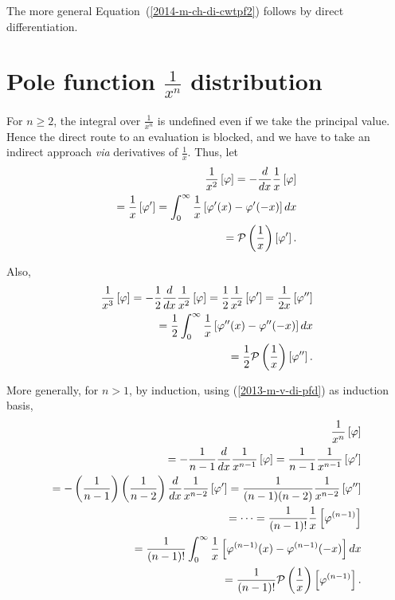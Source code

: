 {The more general Equation~(\ref{2014-m-ch-di-cwtpf2}) follows by direct differentiation.

\eproof
}


\section{Pole function $\frac{1}{x^n}$ distribution}

For $n\ge 2$, the integral over $\frac{1}{x^n}$ is undefined even if we take the principal value.
Hence the direct route to an evaluation is blocked, and we have to take an indirect approach {\it via}
derivatives of\cite{sommer-di} $\frac{1}{x}$.
Thus, let
\begin{equation}
\begin{split}
\frac{1}{x^2} \left[ \varphi \right]
=
-\frac{d}{dx} \frac{1}{x} \left[ \varphi \right] \\
=\frac{1}{x} \left[ \varphi ' \right] =
\int_0^{\infty}  \frac{1}{x}  \left[  \varphi'(x)
-
   \varphi'(-x) \right] dx
\\
 =
{\cal P} \left(\frac{1}{x}\right) \left[\varphi ' \right]
 .
\end{split}
\label{2013-m-v-di-pfd}
\end{equation}

Also,
\begin{equation}
\begin{split}
\frac{1}{x^3} \left[ \varphi \right]
=
-\frac{1}{2}\frac{d}{dx} \frac{1}{x^2} \left[ \varphi \right]
=\frac{1}{2}\frac{1}{x^2} \left[ \varphi ' \right] =  \frac{1}{2x} \left[ \varphi '' \right]\\
=
\frac{1}{2} \int_0^{\infty}  \frac{1}{x}  \left[  \varphi''(x)
-
   \varphi''(-x) \right] dx
\\
 =
\frac{1}{2} {\cal P} \left(\frac{1}{x}\right) \left[\varphi '' \right]
 .
\label{2013-m-v-di-pfd3}
\end{split}
\end{equation}


More generally, for $n>1$, by induction, using (\ref{2013-m-v-di-pfd}) as induction basis,
\begin{equation}
\begin{split}
\frac{1}{x^n} \left[ \varphi \right]  \\
=
-\frac{1}{n-1}\frac{d}{dx} \frac{1}{x^{n-1}} \left[ \varphi \right]
=
 \frac{1}{n-1}  \frac{1}{x^{n-1}} \left[ \varphi' \right]  \\
=
-\left( \frac{1}{n-1} \right) \left(\frac{1}{n-2}\right) \frac{d}{dx} \frac{1}{x^{n-2}} \left[ \varphi' \right]
=
 \frac{1}{(n-1)(n-2)}   \frac{1}{x^{n-2}} \left[ \varphi'' \right]  \\
=   \cdots =
\frac{1}{(n-1)!} \frac{1}{x} \left[ \varphi^{({n-1})} \right]  \\
=\frac{1}{(n-1)!}
\int_0^{\infty}  \frac{1}{x}  \left[  \varphi^{(n-1)}(x)
-
   \varphi^{(n-1)}(-x) \right] dx
\\
 =
\frac{1}{(n-1)!} {\cal P} \left(\frac{1}{x}\right) \left[\varphi^{(n-1)} \right]
 .
\end{split}
\end{equation}




